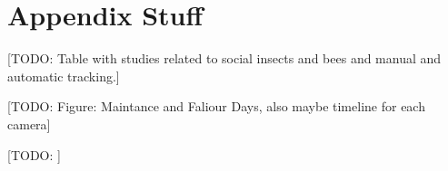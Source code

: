 \chapter{Appendix Stuff}

[TODO: Table with studies related to social insects and bees and manual and automatic tracking.]

[TODO: Figure: Maintance and Faliour Days, also maybe timeline for each camera]

[TODO: ]
